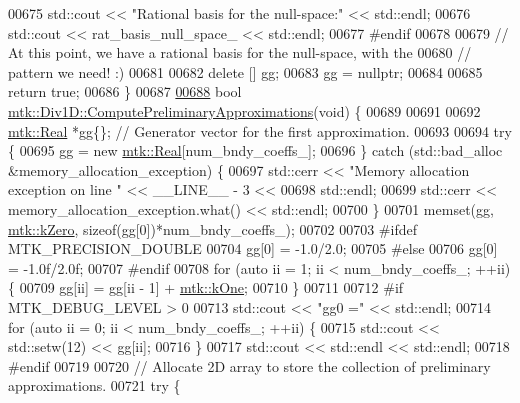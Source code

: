 \begin{DoxyCode}
{{00675   std::cout << \textcolor{stringliteral}{"Rational basis for the null-space:"} << std::endl;
00676   std::cout << rat\_basis\_null\_space\_ << std::endl;
00677 \textcolor{preprocessor}{  #endif}
00678 
00679   \textcolor{comment}{// At this point, we have a rational basis for the null-space, with the}
00680   \textcolor{comment}{// pattern we need! :)}
00681 
00682   \textcolor{keyword}{delete} [] gg;
00683   gg = \textcolor{keyword}{nullptr};
00684 
00685   \textcolor{keywordflow}{return} \textcolor{keyword}{true};
00686 \}
00687 
\hypertarget{mtk__div__1d_8cc_source_l00688}{}\hyperlink{classmtk_1_1Div1D_a4be0534a4e22d44a7aedde326cc3f3b6}{00688} \textcolor{keywordtype}{bool} \hyperlink{classmtk_1_1Div1D_a4be0534a4e22d44a7aedde326cc3f3b6}{mtk::Div1D::ComputePreliminaryApproximations}(\textcolor{keywordtype}{void}) \{
00689 
00691 
00692   \hyperlink{group__c01-roots_gac080bbbf5cbb5502c9f00405f894857d}{mtk::Real} *gg\{\}; \textcolor{comment}{// Generator vector for the first approximation.}
00693 
00694   \textcolor{keywordflow}{try} \{
00695     gg = \textcolor{keyword}{new} \hyperlink{group__c01-roots_gac080bbbf5cbb5502c9f00405f894857d}{mtk::Real}[num\_bndy\_coeffs\_];
00696   \} \textcolor{keywordflow}{catch} (std::bad\_alloc &memory\_allocation\_exception) \{
00697     std::cerr << \textcolor{stringliteral}{"Memory allocation exception on line "} << \_\_LINE\_\_ - 3 <<
00698 std::endl;
00699     std::cerr << memory\_allocation\_exception.what() << std::endl;
00700   \}
00701   memset(gg, \hyperlink{group__c01-roots_ga59a451a5fae30d59649bcda274fea271}{mtk::kZero}, \textcolor{keyword}{sizeof}(gg[0])*num\_bndy\_coeffs\_);
00702 
00703 \textcolor{preprocessor}{  #ifdef MTK\_PRECISION\_DOUBLE}
00704   gg[0] = -1.0/2.0;
00705 \textcolor{preprocessor}{  #else}
00706   gg[0] = -1.0f/2.0f;
00707 \textcolor{preprocessor}{  #endif}
00708   \textcolor{keywordflow}{for} (\textcolor{keyword}{auto} ii = 1; ii < num\_bndy\_coeffs\_; ++ii) \{
00709     gg[ii] = gg[ii - 1] + \hyperlink{group__c01-roots_ga26407c24d43b6b95480943340d285c71}{mtk::kOne};
00710   \}
00711 
00712 \textcolor{preprocessor}{  #if MTK\_DEBUG\_LEVEL > 0}
00713   std::cout << \textcolor{stringliteral}{"gg0 ="} << std::endl;
00714   \textcolor{keywordflow}{for} (\textcolor{keyword}{auto} ii = 0; ii < num\_bndy\_coeffs\_; ++ii) \{
00715     std::cout << std::setw(12) << gg[ii];
00716   \}
00717   std::cout << std::endl << std::endl;
00718 \textcolor{preprocessor}{  #endif}
00719 
00720   \textcolor{comment}{// Allocate 2D array to store the collection of preliminary approximations.}
00721   \textcolor{keywordflow}{try} \{
}}
\end{DoxyCode}
